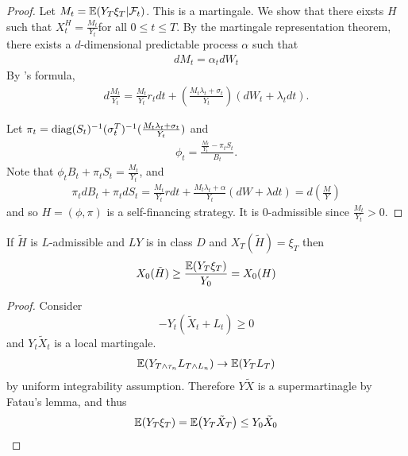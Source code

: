 \begin{proof}
  Let $M_{t} = \E{Y_{T} \xi_{T} | \mathcal{F}_{t}}$.  This is a
  martingale.  We show that there eixsts $H$ such that $X_{t}^{H} =
  \frac{M_{t}}{Y_{t}}$for all $0 \leq t \leq T$.  By the martingale
  representation theorem, there exists a $d$-dimensional predictable
  process $\alpha$ such that
  \begin{align}
    \label{eq:78}
    dM_{t} = \alpha_{t} dW_{t}
  \end{align}  By \ito's formula,
  \begin{align}
    \label{eq:79}
    d \frac{M_{t}}{Y_{t}} = \frac{M_{t}}{Y_{t}} r_{t} dt + (
    \frac{M_{t} \lambda_{t} + \sigma_{t}}{Y_{t}}) (dW_{t} +
    \lambda_{t} dt).
  \end{align}

  Let $\pi_{t} = \operatorname*{diag} (S_{t})^{-1} (\sigma_{t}^{T})^{-1} (\frac{M_{t}
    \lambda_{t} + \sigma_{t}}{Y_{t}})$ and
  \begin{align}
    \label{eq:81}
    \phi_{t} = \frac{\frac{M_{t}}{Y_{t}} - \pi_{t} S_{t}}{B_{t}}.
  \end{align}  Note that $\phi_{t} B_{t} + \pi_{t} S_{t} =
  \frac{M_{t}}{Y_{t}}$, and
  \begin{align}
    \label{eq:82}
    \pi_{t} dB_{t} + \pi_{t} dS_{t} = \frac{M_{t}}{Y_{t}} r dt +
    \frac{M_{t} \lambda_{t} + \alpha}{Y_{t}} (dW  +\lambda dt) = d(\frac{M}{Y})
  \end{align} and so $H = (\phi, \pi)$ is a self-financing strategy.
  It is 0-admissible since $\frac{M_{t}}{Y_{t}} > 0$.
\end{proof}

\begin{thm}
  \label{defn:continuous_time:33}
  If $\tilde H$ is $L$-admissible and $LY$ is in class $D$ and
  $X_{T}(\tilde H) = \xi_{T}$ then
  \begin{align}
    \label{eq:80}
    X_{0}(\tilde H) \geq \frac{\E{Y_{T} \xi_{T}}}{Y_{0}}= X_{0}(H)
  \end{align}
\end{thm}

\begin{proof}
  Consider
  \begin{equation}
    \label{eq:83}
    -Y_{t}(\tilde X_{t} + L_{t}) \geq 0
  \end{equation} and $Y_{t} \tilde X_{t}$ is a local martingale.
  \begin{align}
    \label{eq:84}
    \E{Y_{T \wedge \tau_{n}} L_{T \wedge L_{n}}} \rightarrow \E{Y_{T}
      L_{T}}
  \end{align} by uniform integrability assumption. Therefore $Y \tilde
  X$ is a supermartinagle by Fatau's lemma, and thus
  \begin{align}
    \label{eq:85}
    \E{Y_{T}\xi_{T}} = \E{Y_{T} \tilde X_{T}} \leq Y_{0} \tilde X_{0}
  \end{align}
\end{proof}



